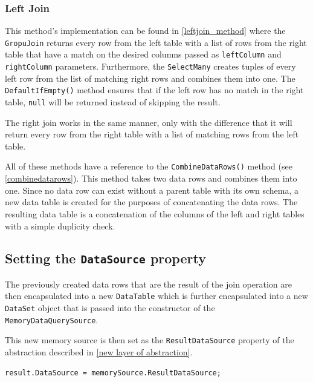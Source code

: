 \documentclass[
  print,
  table,
  nolof,
  nolot,
  nocover,
  oneside
]{fithesis3}
\begin{document}
\subsubsection{Left Join}

This method's implementation can be found in \autoref{leftjoin_method} where the \texttt{GropuJoin} returns every row from the left table with a list of rows from the right table that have a match on the desired columns passed as \texttt{leftColumn} and \texttt{rightColumn} parameters. Furthermore, the \texttt{SelectMany} creates tuples of every left row from the list of matching right rows and combines them into one. The \texttt{DefaultIfEmpty()} method ensures that if the left row has no match in the right table, \texttt{null} will be returned instead of skipping the result.

The right join works in the same manner, only with the difference that it will return every row from the right table with a list of matching rows from the left table\parencite{left_join}.

All of these methods have a reference to the \texttt{CombineDataRows()} method (see \autoref{combinedatarows}). This method takes two data rows and combines them into one. Since no data row can exist without a parent table with its own schema, a new data table is created for the purposes of concatenating the data rows. The resulting data table is a concatenation of the columns of the left and right tables with a simple duplicity check.

\subsection{Setting the \texttt{DataSource} property}
\label{setting the DataSource}

The previously created data rows that are the result of the join operation are then encapsulated into a new \texttt{DataTable} which is further encapsulated into a new \texttt{DataSet} object that is passed into the constructor of the \texttt{MemoryDataQuerySource}.

This new memory source is then set as the \texttt{ResultDataSource} property of the abstraction described in \autoref{new layer of abstraction}.
\begin{lstlisting}
result.DataSource = memorySource.ResultDataSource;
\end{lstlisting}
\end{document}
